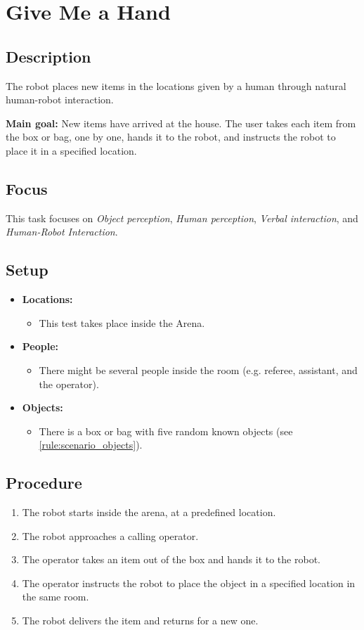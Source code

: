 \section{Give Me a Hand}
\label{test:give-me-a-hand}

\subsection*{Description}
The robot places new items in the locations given by a human through natural human-robot interaction.

\textbf{Main goal:}
New items have arrived at the house. The user takes each item from the box or bag, one by one, hands it to the robot, and instructs the robot to place it in a specified location.

\subsection*{Focus}
This task focuses on
\textit{Object perception},
\textit{Human perception},
\textit{Verbal interaction}, and
\textit{Human-Robot Interaction}.

\subsection*{Setup}
\begin{itemize}[nosep]	
	\item \textbf{Locations:} 
	\begin{itemize}
		\item This test takes place inside the Arena.
	\end{itemize}	 
	\item \textbf{People:} 
	\begin{itemize}
		\item There might be several people inside the room (e.g. referee, assistant, and the operator).
	\end{itemize}
	\item \textbf{Objects:}
		\begin{itemize}
			\item There is a box or bag with five random known objects (see \ref{rule:scenario_objects}).
		\end{itemize}
\end{itemize}

\subsection*{Procedure}
\begin{enumerate}[nosep]
	\item The robot starts inside the arena, at a predefined location.
	\item The robot approaches a calling operator.
	\item The operator takes an item out of the box and hands it to the robot. 
	\item The operator instructs the robot to place the object in a specified location in the same room.
	\item The robot delivers the item and returns for a new one.
\end{enumerate}



